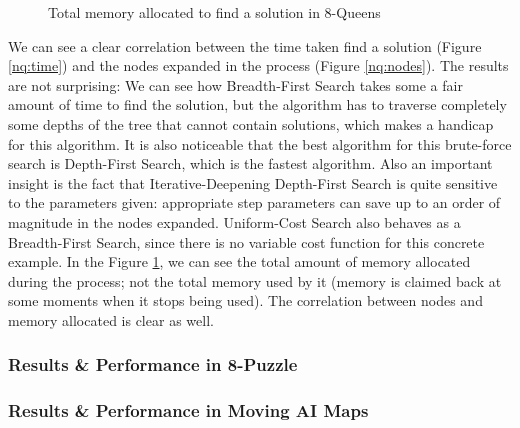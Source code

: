 \begin{figure}[!htbp]
  \centering
  \caption{Total memory allocated to find a solution in 8-Queens}
  \label{nq:memory}
\end{figure}


We can see a clear correlation between the time taken find a solution (Figure
\ref{nq:time}) and the nodes expanded in the process (Figure \ref{nq:nodes}).
The results are not surprising: We can see how Breadth-First Search takes some
a fair amount of time to find the solution, but the algorithm has to traverse
completely some depths of the tree that cannot contain solutions, which makes
a handicap for this algorithm. It is also noticeable that the best algorithm
for this brute-force search is Depth-First Search, which is the fastest
algorithm. Also an important insight is the fact that Iterative-Deepening
Depth-First Search is quite sensitive to the parameters given: appropriate step
parameters can save up to an order of magnitude in the nodes expanded.
Uniform-Cost Search also behaves as a Breadth-First Search, since there is no
variable cost function for this concrete example. In the Figure
\ref{nq:memory}, we can see the total amount of memory allocated during the
process; not the total memory used by it (memory is claimed back at some
moments when it stops being used). The correlation between nodes and memory
allocated is clear as well.\\

\subsubsection{Results \& Performance in 8-Puzzle}

\subsubsection{Results \& Performance in Moving AI Maps}


